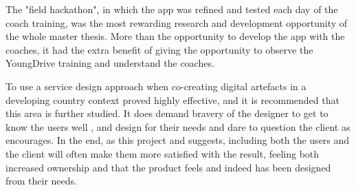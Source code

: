 The "field hackathon", in which the app was refined and tested each day of the coach training, was the most rewarding research and development opportunity of the whole master thesis. More than the opportunity to develop the app with the coaches, it had the extra benefit of giving the opportunity to observe the YoungDrive training and understand the coaches.

To use a service design approach when co-creating digital artefacts in a developing country context proved highly effective, and it is recommended that this area is further studied. It does demand bravery of the designer to get to know the users well \citep{lowgren}, and design for their needs and dare to question the client as \cite{stickdorn} encourages. In the end, as this project and \cite{stickdorn} suggests, including both the users and the client will often make them more satisfied with the result, feeling both increased ownership and that the product feels and indeed has been designed from their needs.


